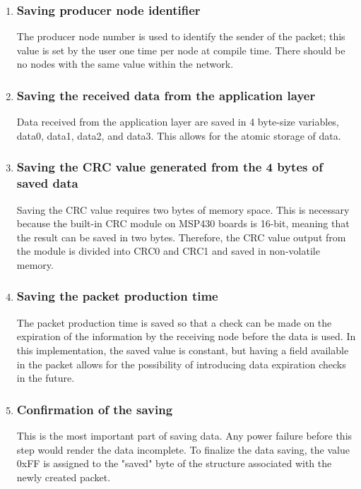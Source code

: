 \begin{enumerate}
  \item \subsubsection{Saving producer node identifier}
  The producer node number is used to identify the sender of the packet; this value is set by the user one time per node at compile time. There should be no nodes with the same value within the network.
  
  
  
  \item \subsubsection{Saving the received data from the application layer}
  Data received from the application layer are saved in 4 byte-size variables, data0, data1, data2, and data3. This allows for the atomic storage of data.

  
  \item \subsubsection{Saving the CRC value generated from the 4 bytes of saved data}
  Saving the CRC value requires two bytes of memory space. This is necessary because the built-in CRC module on MSP430 boards is 16-bit, meaning that the result can be saved in two bytes. Therefore, the CRC value output from the module is divided into CRC0 and CRC1 and saved in non-volatile memory.
  \item \subsubsection{Saving the packet production time}
  The packet production time is saved so that a check can be made on the expiration of the information by the receiving node before the data is used. In this implementation, the saved value is constant, but having a field available in the packet allows for the possibility of introducing data expiration checks in the future.
  \item \subsubsection{Confirmation of the saving}
  This is the most important part of saving data. Any power failure before this step would render the data incomplete. To finalize the data saving, the value 0xFF is assigned to the "saved" byte of the structure associated with the newly created packet.
\end{enumerate}





